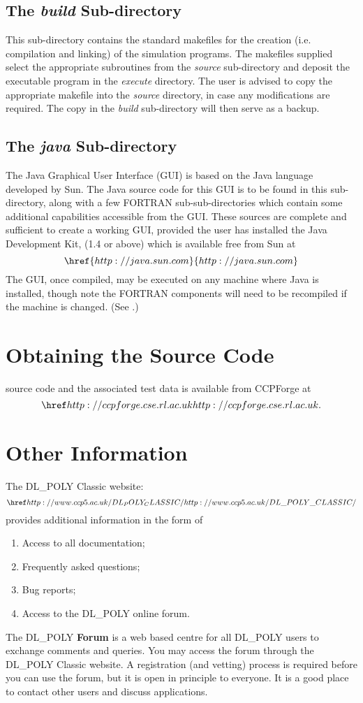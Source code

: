 \subsection{The {\em build} Sub-directory}

This sub-directory contains the standard makefiles for the creation
(i.e. compilation and linking) of the \D{} simulation programs.
The makefiles supplied select the appropriate subroutines from the
{\em source} sub-directory and deposit the executable program in the
{\em execute} directory. The user is advised to copy the appropriate
makefile into the {\em source} directory, in case any modifications are
required. The copy in the {\em build} sub-directory will then serve as a
backup. 

\subsection{The {\em java} Sub-directory}

The \D{} Java Graphical User Interface (GUI) is based on the Java language developed by Sun.  The Java
source code for this GUI is to be found in this sub-directory, along
with a few FORTRAN sub-sub-directories which contain some additional
capabilities accessible from the GUI. These sources are complete and
sufficient to create a working GUI, provided the user has installed
the Java Development Kit, (1.4 or above) which is available free from
Sun at 
\[\href{http://java.sun.com}{http://java.sun.com}\] 
The GUI, once compiled, may be
executed on any machine where Java is installed, though note the
FORTRAN components will need to be recompiled if the machine is
changed.  (See \cite{smith-gui}.)

\section{Obtaining the Source Code}

 \D{} source code and the associated test data is available from
CCPForge at \[ \FORGE{}. \]


\section{Other Information}

The DL\_POLY Classic website: \[\WEB{} \index{WWW}\]
provides additional information in the form of
\begin{enumerate}
\item Access to all documentation;
\item Frequently asked questions;
\item Bug reports;
\item Access to the DL\_POLY online forum.
\end{enumerate}
\noindent
The DL\_POLY {\bf Forum} is a web based centre for all DL\_POLY users to
exchange comments and queries. You may access the forum through the DL\_POLY
Classic website. A registration (and vetting) process is required before you
can use the forum, but it is open in principle to everyone. It is a good place
to contact other users and discuss applications.

\clearpage
